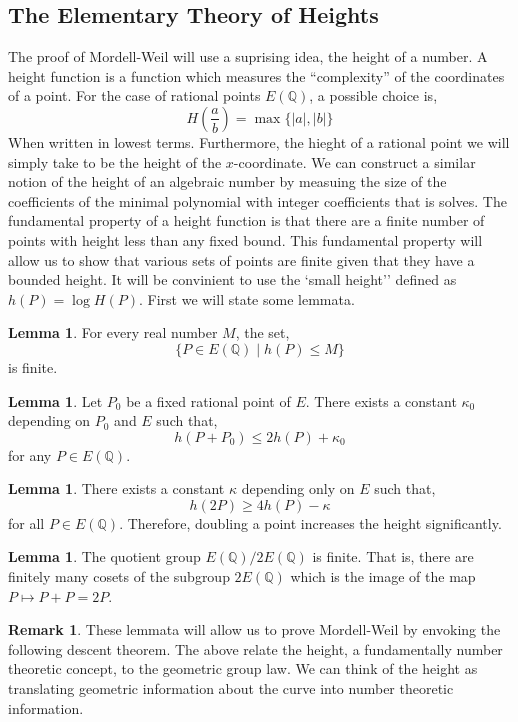 \documentclass{article}
\newcommand{\Q}{\mathbb{Q}}
\theoremstyle{definition}
\newtheorem{lemma}[theorem]{Lemma}
\newtheorem{remark}{Remark}[section]
\begin{document}
\subsection{The Elementary Theory of Heights}

The proof of Mordell-Weil will use a suprising idea, the height of a number. A height function is a function which measures the ``complexity'' of the coordinates of a point. For the case of rational points $E(\Q)$, a possible choice is,
\[ H(\frac{a}{b}) = \max\{ |a|, |b| \} \]
When written in lowest terms. Furthermore, the hieght of a rational point we will simply take to be the height of the $x$-coordinate. We can construct a similar notion of the height of an algebraic number by measuing the size of the coefficients of the minimal polynomial with integer coefficients that is solves. The fundamental property of a height function is that there are a finite number of points with height less than any fixed bound. This fundamental property will allow us to show that various sets of points are finite given that they have a bounded height. It will be convinient to use the `small height'' defined as $h(P) = \log{H(P)}$. First we will state some lemmata.

\begin{lemma}
For every real number $M$, the set,
\[ \{ P \in E(\Q) \mid h(P) \le M \} \]
is finite.
\end{lemma} 

\begin{lemma}
Let $P_0$ be a fixed rational point of $E$. There exists a constant $\kappa_0$ depending on $P_0$ and $E$ such that,
\[ h(P + P_0) \le 2 h(P) + \kappa_0 \]
for any $P \in E(\Q)$. 
\end{lemma}

\begin{lemma}
There exists a constant $\kappa$ depending only on $E$ such that,
\[ h(2 P ) \ge 4 h(P) - \kappa \]
for all $P \in E(\Q)$. Therefore, doubling a point increases the height significantly. 
\end{lemma}

\begin{lemma}
The quotient group $E(\Q) / 2 E(\Q)$ is finite. That is, there are finitely many cosets of the subgroup $2 E(\Q)$ which is the image of the map $P \mapsto P + P = 2 P$. 
\end{lemma}

\begin{remark}
These lemmata will allow us to prove Mordell-Weil by envoking the following descent theorem. The above relate the height, a fundamentally number theoretic concept, to the geometric group law. We can think of the height as translating geometric information about the curve into number theoretic information.
\end{remark}  
\end{document}
